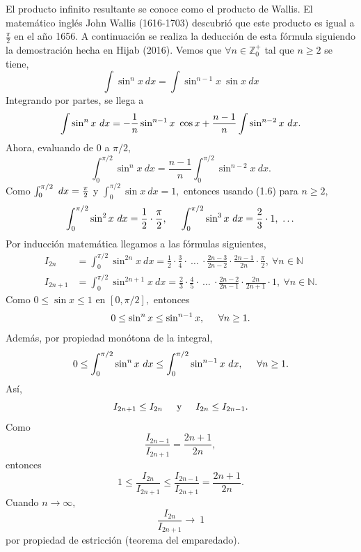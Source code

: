 El producto infinito resultante se conoce como el producto de Wallis. El matemático inglés John Wallis (1616-1703) descubrió que este producto es igual a $\frac{\pi}{2}$ en el año 1656. A continuación se realiza la deducción de esta fórmula siguiendo la demostración hecha en Hijab (2016).
Vemos que $\forall n\in \mathbb{Z}_0^+$ tal que $n\geq2$ se tiene, $$\int\sin^n x\ dx = \int\sin^{n-1} x \ \sin x \ dx$$
Integrando por partes, se llega a
\begin{equation}
	\int\sin^n x \ dx = -{1 \over n}\sin^{n-1} x \ \cos x +\frac{n-1}{n}\int\sin^{n-2} x \ dx.
\end{equation}
Ahora, evaluando de $0$ a $\pi/2,$ $$\int_{0}^{\pi/2}\sin^n x\ dx = \frac{n-1}{n}\int_{0}^{\pi/2}\sin^{n-2} x \ dx.$$
Como $\int_{0}^{\pi/2} \ dx = {\pi \over 2}$ y $\int_{0}^{\pi/2}\sin x \ dx = 1,$ entonces usando (1.6) para $n\geq2,$ $$\int_{0}^{\pi/2}\sin^2 x \ dx = {1 \over 2}\cdot{\pi \over 2}, \hspace{0.5cm}\int_{0}^{\pi/2}\sin^3 x \ dx = {2 \over 3}\cdot 1,\ \dots$$
Por inducción matemática llegamos a las fórmulas siguientes,
\begin{align*}
	I_{2n} &= \int_{0}^{\pi/2}\sin^{2n} x \ dx = \frac{1}{2}\cdot\frac{3}{4}\cdot\ \dots\ \cdot \frac{2n-3}{2n-2}\cdot\frac{2n-1}{2n}\cdot\frac{\pi}{2}, \ \forall n \in \mathbb{N}\\
	I_{2n+1} &= \int_{0}^{\pi/2}\sin^{2n+1} x \ dx = \frac{2}{3}\cdot\frac{4}{5}\cdot\ \dots\ \cdot \frac{2n-2}{2n-1}\cdot\frac{2n}{2n+1}\cdot 1, \ \forall n \in \mathbb{N}.
\end{align*}
Como $0\leq\sin x \leq1$ en $[0,\pi/2],$ entonces $$0\leq\sin^n x \leq\sin^{n-1} x ,\hspace{0.5 cm}\forall n\geq 1.$$
Además, por propiedad monótona de la integral, $$0 \leq \int_{0}^{\pi/2}\sin^n x \ dx \leq \int_{0}^{\pi/2}\sin^{n-1} x \ dx,\hspace{0.5cm} \forall n\geq 1.$$
Así, $$I_{2n+1}\leq I_{2n}\hspace{0.5cm} \textrm{y} \hspace{0.5cm}I_{2n}\leq I_{2n-1}.$$
Como $$\frac{I_{2n-1}}{I_{2n+1}} = \frac{2n+1}{2n},$$ entonces $$1\leq\frac{I_{2n}}{I_{2n+1}}\leq \frac{I_{2n-1}}{I_{2n+1}} = \frac{2n+1}{2n}.$$
Cuando $n\rightarrow\infty,$ $$\frac{I_{2n}}{I_{2n+1}}\rightarrow\ 1$$ por propiedad de estricción (teorema del emparedado).

